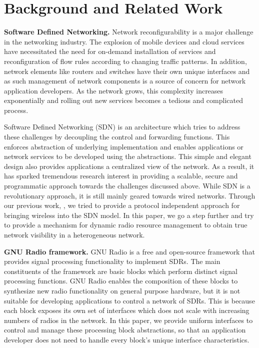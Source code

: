 \section{Background and Related Work}
\label{sec:related}
\textbf{Software Defined Networking.}
Network reconfigurability is a major challenge in the networking industry. The explosion of mobile devices and cloud services have necessitated the need for on-demand installation of services and reconfiguration of flow rules according to changing traffic patterns. In addition, network elements like routers and switches have their own unique interfaces and as such management of network components is a source of concern for network application developers. As the network grows, this complexity increases exponentially and rolling out new services becomes a tedious and complicated process.

Software Defined Networking (SDN) is an architecture which tries to address these challenges by decoupling the control and forwarding functions. This enforces abstraction of underlying implementation and enables applications or network services to be developed using the abstractions. This simple and elegant design also provides applications a centralized view of the network. As a result, it has sparked tremendous research interest in providing a scalable, secure and programmatic approach towards the challenges discussed above. While SDN is a revolutionary approach, it is still mainly geared towards wired networks. 
Through our previous work, \aetherflow \cite{aetherflow}, we tried to provide a protocol independent approach for bringing wireless into the SDN model. In this paper, we go a step further and try to provide a mechanism for dynamic radio resource management to obtain true network visibility in a heterogeneous network.     

\textbf{GNU Radio framework.}
GNU Radio \cite{gnuradio} is a free and open-source framework that provides signal processing functionality to implement SDRs. The main constituents of the framework are basic blocks which perform distinct signal processing functions. GNU Radio enables the composition of these blocks to synthesize new radio functionality on general purpose hardware, but it is not suitable for developing applications to control a network of SDRs. This is because each block exposes its own set of interfaces which does not scale with increasing numbers of radios in the network. In this paper, we provide uniform interfaces to control and manage these processing block abstractions, so that an application developer does not need to handle every block's unique interface characteristics.

